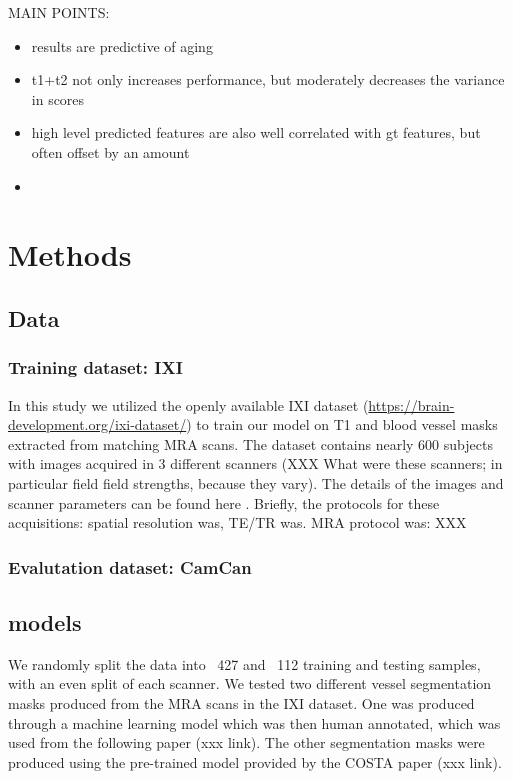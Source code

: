 \documentclass[pdflatex,sn-mathphys-num]{sn-jnl}
\begin{document}
MAIN POINTS:
\begin{itemize}
    \item results are predictive of aging
    \item t1+t2 not only increases performance, but moderately decreases the variance in scores
    \item high level predicted features are also well correlated with gt features, but often offset by an amount
    \item

\end{itemize}

\section{Methods}

\subsection{Data}

\subsubsection{Training dataset: IXI}

In this study we utilized the openly available IXI dataset (\url{https://brain-development.org/ixi-dataset/}) to train our model on T1 and blood vessel masks extracted from matching MRA scans. The dataset contains nearly 600 subjects with images acquired in 3 different scanners (XXX What were these scanners; in particular field field strengths, because they vary). The details of the images and scanner parameters can be found here . Briefly, the protocols for these acquisitions: spatial resolution was, TE/TR was. MRA protocol was: XXX

\subsubsection{Evalutation dataset: CamCan}

\subsection{models}

We randomly split the data into ~427 and ~112 training and testing samples, with an even split of each scanner. We tested two different vessel segmentation masks produced from the MRA scans in the IXI dataset. One was produced through a machine learning model which was then human annotated, which was used from the following paper (xxx link). The other segmentation masks were produced using the pre-trained model provided by the COSTA paper (xxx link).
\end{document}

